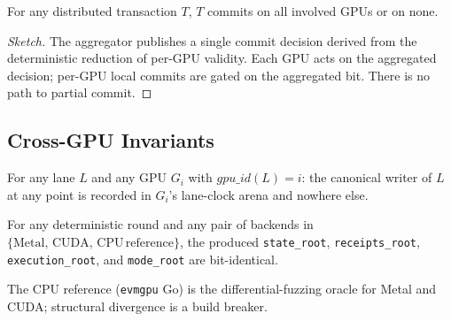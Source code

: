 \begin{lemma}
\label{lem:distributed-atomic}
For any distributed transaction $T$, $T$ commits on all involved
GPUs or on none.
\end{lemma}

\begin{proof}[Sketch]
The aggregator publishes a single commit decision derived from the
deterministic reduction of per-GPU validity. Each GPU acts on the
aggregated decision; per-GPU local commits are gated on the
aggregated bit. There is no path to partial commit.
\end{proof}

\subsection{Cross-GPU Invariants}

\begin{invariant}
\label{inv:cross-gpu-lane}
For any lane $L$ and any GPU $G_i$ with $\mathit{gpu\_id}(L) = i$:
the canonical writer of $L$ at any point is recorded in $G_i$'s
lane-clock arena and nowhere else.
\end{invariant}

\begin{invariant}
\label{inv:cross-backend}
For any deterministic round and any pair of backends in
$\{\mathrm{Metal},\, \mathrm{CUDA},\, \mathrm{CPU\,reference}\}$, the
produced \texttt{state\_root}, \texttt{receipts\_root},
\texttt{execution\_root}, and \texttt{mode\_root} are
bit-identical.
\end{invariant}

The CPU reference (\texttt{evmgpu} Go) is the differential-fuzzing
oracle for Metal and CUDA; structural divergence is a build
breaker.


